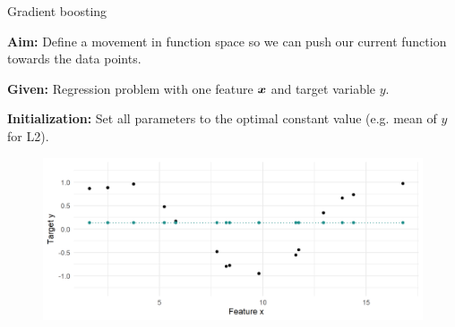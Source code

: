 \begin{vbframe}{Gradient boosting}

\textbf{Aim:} Define a movement in function space so we can push our current function towards the data points.

\vspace*{0.1cm}
\textbf{Given:} Regression problem with one feature $\bm{x}$ and target variable $y$.

\vspace*{0.1cm}
\textbf{Initialization:} Set all parameters to the optimal constant value (e.g. mean of $y$ for L2).

\begin{figure}
  \includegraphics[width=\textwidth]{figure/fig-gb-concept-1.png}
\end{figure}



\end{vbframe}

